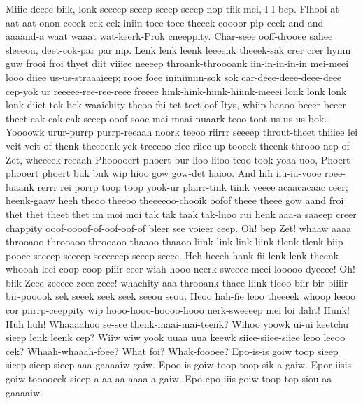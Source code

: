 \documentclass[12pt,a4paper]{article}
\begin{document}
\begin{drama}
\pistspeaks
Miiie deeee biik, lonk seeeep seeep seeep seeep-nop tiik mei, I I bep. Flhooi at-aat-aat onon ceeek cek cek iniin toee toee-theeek coooor pip ceek and and aaaand-a waat waaat wat-keerk-Prok cneeppity.
\epopspeaks
Char-seee ooff-drooee sahee sleeeou, deet-cok-par par nip. Lenk lenk leenk leeeenk theeek-sak crer crer hymn guw frooi froi thyet diit viiiee neeeep throank-throooank iin-in-in-in-in mei-meei looo diiee us-us-straaaieep; rooe foee ininiiniin-sok sok car-deee-deee-deee-deee cep-yok ur reeeee-ree-ree-reee freeee hink-hink-hiink-hiiink-meeei lonk lonk lonk lonk diiet tok bek-waaichity-theoo fai tet-teet oof Itys, whiip haaoo beeer beeer theet-cak-cak-cak seeep ooof sooe mai maai-nuaark teoo toot us-us-us bok. Yoooowk urur-purrp purrp-reeaah noork teeoo riirrr seeeep throut-theet thiiiee lei veit veit-of thenk theeeenk-yek treeeoo-riee riiee-up tooeek theenk throoo nep of Zet, wheeeek reeaah-Phooooert phoert bur-lioo-liioo-teoo took yoaa uoo, Phoert phooert phoert buk buk wip hioo gow gow-det haioo. And hih iiu-iu-vooe roee-luaank rerrr rei porrp toop toop yook-ur plairr-tink tiink veeee acaacacaac ceer; heenk-gaaw heeh theoo theeoo theeeeoo-chooik oofof theee theee gow aand froi thet thet theet thet im moi moi tak tak taak tak-liioo rui henk aaa-a saaeep creer chappity ooof-oooof-of-oof-oof-of bleer see voieer ceep.  
\pistspeaks
Oh! bep Zet! whaaw aaaa throoaoo throoaoo throoaoo thaaoo thaaoo liink link link liink tlenk tlenk biip pooee seeeep seeeep seeeeeep seeep seeee. Heh-heeeh hank fii lenk lenk theenk whooah leei coop coop piiir ceer wiah hooo neerk sweeee meei looooo-dyeeee! Oh! biik Zeee zeeeee zeee zeee! whachity aaa throoank thaee liink tleoo biir-bir-biiiir-bir-pooook sek seeek seek seek seeou seou. Heoo hah-fie leoo theeeek whoop leeoo cor piirrp-ceeppity wip hooo-hooo-hoooo-hooo nerk-sweeeep mei loi daht!
\euelspeaks
Hunk! Huh huh!
\pistspeaks
Whaaaahoo se-see thenk-maai-mai-teenk?
\euelspeaks
Wihoo yoowk ui-ui keetchu sieep lenk leenk cep? Wiiw wiw yook uuaa uua keewk siiee-siiee-siiee leoo leeoo cek?
\pistspeaks
Whaah-whaaah-foee? What foi? Whak-foooee?
\euelspeaks
Epo-is-is goiw toop sieep sieep sieep sieep aaa-gaaaaiw gaiw. Epoo is goiw-toop toop-sik a gaiw. Epor iisis goiw-tooooeek sieep a-aa-aa-aaaa-a gaiw. Epo epo iiis goiw-toop top siou aa gaaaaiw.
\epopspeaks

\end{drama}
\end{document}
